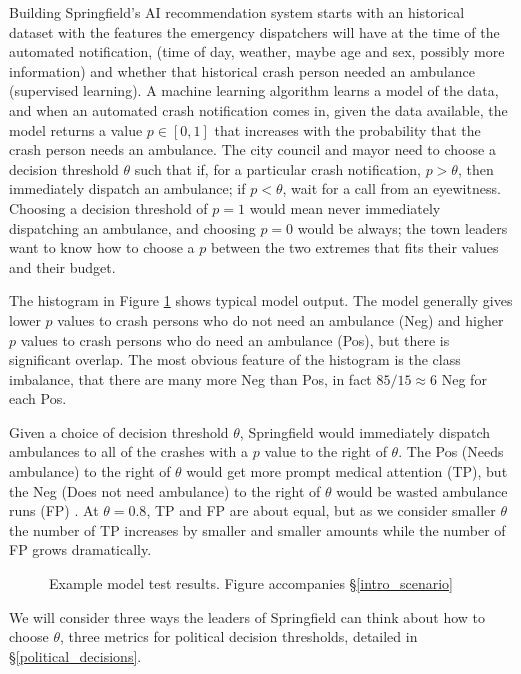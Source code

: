 \FloatBarrier

Building Springfield's AI recommendation system starts with an historical dataset with the features the emergency dispatchers will have at the time of the automated notification, (time of day, weather, maybe age and sex, possibly more information) and whether that historical crash person needed an ambulance (supervised learning).  A machine learning algorithm learns a model of the data, and when an automated crash notification comes in, given the data available, the model returns a value $p \in [0,1]$ that increases with the probability that the crash person needs an ambulance.  The city council and mayor need to choose a decision threshold $\theta$ such that if, for a particular crash notification, $p>\theta$, then immediately dispatch an ambulance; if $p<\theta$, wait for a call from an eyewitness.  Choosing a decision threshold of $p=1$ would mean never immediately dispatching an ambulance, and choosing $p=0$ would be always; the town leaders want to know how to choose a $p$ between the two extremes that fits their values and their budget.

The histogram in Figure \ref{intro_ideal} shows typical model output.  The model generally gives lower $p$ values to crash persons who do not need an ambulance (Neg) and higher $p$ values to crash persons who do need an ambulance (Pos), but there is significant overlap.  The most obvious feature of the histogram is the class imbalance, that there are many more Neg than Pos, in fact $85/15 \approx 6$ Neg for each Pos.  

Given a choice of decision threshold $\theta$, Springfield would immediately dispatch ambulances to all of the crashes with a $p$ value to the right of $\theta$.  The Pos (Needs ambulance) to the right of $\theta$ would get more prompt medical attention (TP), but the Neg (Does not need ambulance) to the right of $\theta$ would be wasted ambulance runs (FP) .  At $\theta = 0.8$, TP and FP are about equal, but as we consider smaller $\theta$ the number of TP increases by smaller and smaller amounts while the number of FP grows dramatically.  

\begin{figure}[h]
\centering
		
\caption{\normalfont\normalsize Example model test results.  Figure accompanies \S\ref{intro_scenario}}
\label{intro_ideal}
\end{figure}

\FloatBarrier

We will consider three ways the leaders of Springfield can think about how to choose $\theta$, three metrics for political decision thresholds, detailed in \S \ref{political_decisions}.

